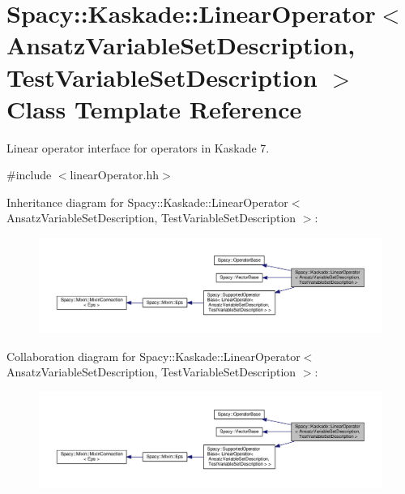 \hypertarget{classSpacy_1_1Kaskade_1_1LinearOperator}{}\section{Spacy\+:\+:Kaskade\+:\+:Linear\+Operator$<$ Ansatz\+Variable\+Set\+Description, Test\+Variable\+Set\+Description $>$ Class Template Reference}
\label{classSpacy_1_1Kaskade_1_1LinearOperator}


Linear operator interface for operators in Kaskade 7.  




{\ttfamily \#include $<$linear\+Operator.\+hh$>$}



Inheritance diagram for Spacy\+:\+:Kaskade\+:\+:Linear\+Operator$<$ Ansatz\+Variable\+Set\+Description, Test\+Variable\+Set\+Description $>$\+:\nopagebreak
\begin{figure}[H]
\begin{center}
\leavevmode
\includegraphics[width=350pt]{classSpacy_1_1Kaskade_1_1LinearOperator__inherit__graph}
\end{center}
\end{figure}


Collaboration diagram for Spacy\+:\+:Kaskade\+:\+:Linear\+Operator$<$ Ansatz\+Variable\+Set\+Description, Test\+Variable\+Set\+Description $>$\+:\nopagebreak
\begin{figure}[H]
\begin{center}
\leavevmode
\includegraphics[width=350pt]{classSpacy_1_1Kaskade_1_1LinearOperator__coll__graph}
\end{center}
\end{figure}
